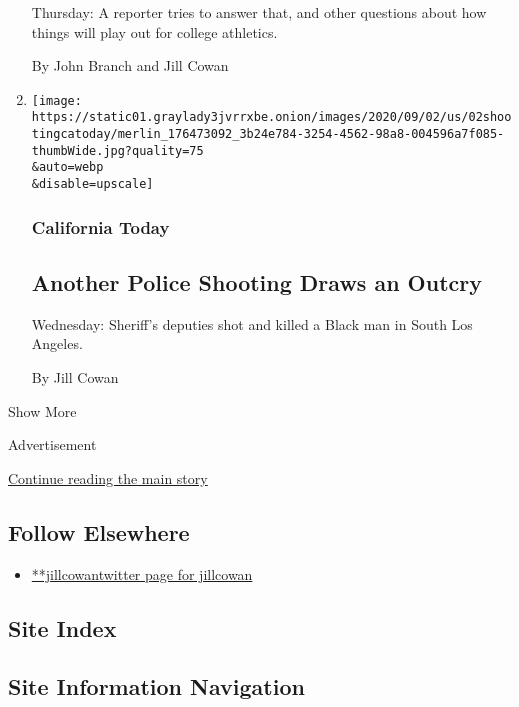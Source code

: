 \begin{enumerate}
  Thursday: A reporter tries to answer that, and other questions about
  how things will play out for college athletics.

  By John Branch and Jill Cowan
\item
  \href{/2020/09/02/us/california-eviction-ab-3088.html}{}

  \texttt{[image: https://static01.graylady3jvrrxbe.onion/images/2020/09/02/us/02shootingcatoday/merlin\_176473092\_3b24e784-3254-4562-98a8-004596a7f085-thumbWide.jpg?quality=75\\\&auto=webp\\\&disable=upscale]}

  \hypertarget{california-today-6}{%
  \subsubsection{California Today}\label{california-today-6}}

  \hypertarget{another-police-shooting-draws-an-outcry}{%
  \subsection{Another Police Shooting Draws an
  Outcry}\label{another-police-shooting-draws-an-outcry}}

  Wednesday: Sheriff's deputies shot and killed a Black man in South Los
  Angeles.

  By Jill Cowan
\end{enumerate}

Show More

Advertisement

\protect\hyperlink{after-mid2}{Continue reading the main story}

\hypertarget{follow-elsewhere}{%
\subsection{Follow Elsewhere}\label{follow-elsewhere}}

\begin{itemize}
\tightlist
\item
  \href{https://twitter.com/jillcowan}{**jillcowantwitter page for
  jillcowan}
\end{itemize}

\hypertarget{site-index}{%
\subsection{Site Index}\label{site-index}}

\hypertarget{site-information-navigation}{%
\subsection{Site Information
Navigation}\label{site-information-navigation}}

